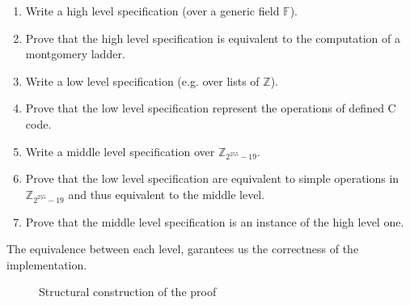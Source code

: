 \begin{enumerate}
  \item Write a high level specification (over a generic field $\mathbb{F}$).
  \item Prove that the high level specification is equivalent to the
  computation of a montgomery ladder.
  \item Write a low level specification (e.g. over lists of $\mathbb{Z}$).
  \item Prove that the low level specification represent the operations of
  defined C code.
  \item Write a middle level specification over $\mathbb{Z}_{2^{255}-19}$.
  \item Prove that the low level specification are equivalent to simple
  operations in $\mathbb{Z}_{2^{255}-19}$ and thus equivalent to the middle level.
  \item Prove that the middle level specification is an instance of the high
  level one.
\end{enumerate}

The equivalence between each level, garantees us the correctness of the
implementation.

\begin{figure}[h]
  
  \caption{Structural construction of the proof}
  \label{tk:ProofStructure}
\end{figure}
